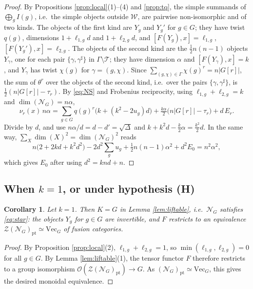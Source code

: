 \documentclass[10pt]{article}
\theoremstyle{plain}
\newtheorem{corollary}[theorem]{Corollary}
\theoremstyle{definition}
\theoremstyle{plain}
\begin{document}
\begin{proof}
By Propositions \ref{prop:local}(1)--(4) and \ref{prop:tq}, the simple summands of $\bigoplus_gI(g)$, i.e.\ the simple objects outside $\mathcal{W}$, are pairwise non-isomorphic and of two kinds. The objects of the first kind are $Y_g$ and $Y_g'$ for $g\in G$; they have twist $q(g)$, dimensions $1+\ell_{1,g}d$ and $1+\ell_{2,g}d$, and $[F(Y_g),x]=\ell_{1,g}$, $[F(Y_g'),x]=\ell_{2,g}$. The objects of the second kind are the $\frac12n(n-1)$ objects $Y_\gamma$, one for each pair $\{\gamma,\gamma^\sharp\}$ in $\Gamma\setminus\mathcal{T}$; they have dimension $\alpha$ and $[F(Y_\gamma),x]=k$, and $Y_\gamma$ has twist $\chi(g)$ for $\gamma=(g,\chi)$. Since $\sum_{(g,\chi)\in\Gamma}\chi(g)^r=n|G[r]|$, the sum of $\theta^r$ over the objects of the second kind, i.e.\ over the pairs $\{\gamma,\gamma^\sharp\}$, is $\frac12(n|G[r]|-\tau_r)$. By \eqref{eq:NS} and Frobenius reciprocity, using $\ell_{1,g}+\ell_{2,g}=k$ and $\dim(\mathcal{N}_G)=n\alpha$,
\[
\nu_r(x)\,n\alpha=\sum_{g\in G}q(g)^r\bigl(k+(k^2-2u_g)d\bigr)+\tfrac{k\alpha}{2}\bigl(n|G[r]|-\tau_r\bigr)+d\,E_r .
\]
Divide by $d$, and use $n\alpha/d=d-d'=\sqrt\Delta$ and $k+k^2d-\frac k2\alpha=\frac{k^2}{2}d$. In the same way, $\sum_X\dim(X)^2=\dim(\mathcal{N}_G)^2$ reads
\[
n\bigl(2+2kd+k^2d^2\bigr)-2d^2\sum_{g}u_g+\tfrac12n(n-1)\alpha^2+d^2E_0=n^2\alpha^2,
\]
which gives $E_0$ after using $d^2=knd+n$.
\end{proof}

\subsection{When \texorpdfstring{$k=1$}{k=1}, or under hypothesis (H)}\label{subsec:k1}

\begin{corollary}\label{cor:k1}
    Let $k=1$.  Then $K=G$ in Lemma \ref{lem:liftable}, i.e.\ $\mathcal{N}_G$ satisfies \eqref{eq:star}: the objects $Y_g$ for $g\in G$ are invertible, and $F$ restricts to an equivalence $\mathcal{Z}(\mathcal{N}_G)_\mathrm{pt}\simeq\mathrm{Vec}_G$ of fusion categories.
\end{corollary}

\begin{proof}
    By Proposition \ref{prop:local}(2), $\ell_{1,g}+\ell_{2,g}=1$, so $\min(\ell_{1,g},\ell_{2,g})=0$ for all $g\in G$. By Lemma \ref{lem:liftable}(1), the tensor functor $F$ therefore restricts to a group isomorphism $\mathcal{O}(\mathcal{Z}(\mathcal{N}_G)_\mathrm{pt})\to G$. As $(\mathcal{N}_G)_\mathrm{pt}\simeq\mathrm{Vec}_G$, this gives the desired monoidal equivalence.
\end{proof}
\end{document}
